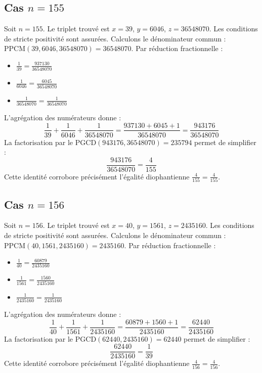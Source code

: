 \documentclass[11pt,a4paper]{article}
\begin{document}
\subsection{Cas $n = 155$}
Soit $n = 155$. Le triplet trouvé est $x = 39$, $y = 6046$, $z = 36548070$.
Les conditions de stricte positivité sont assurées.
Calculons le dénominateur commun : $\text{PPCM}(39, 6046, 36548070) = 36548070$.
Par réduction fractionnelle :
\begin{itemize}
    \item $\frac{1}{39} = \frac{937130}{36548070}$
    \item $\frac{1}{6046} = \frac{6045}{36548070}$
    \item $\frac{1}{36548070} = \frac{1}{36548070}$
\end{itemize}
L'agrégation des numérateurs donne :
$$ \frac{1}{39} + \frac{1}{6046} + \frac{1}{36548070} = \frac{937130 + 6045 + 1}{36548070} = \frac{943176}{36548070} $$
La factorisation par le $\text{PGCD}(943176, 36548070) = 235794$ permet de simplifier :
$$ \frac{943176}{36548070} = \frac{4}{155} $$
Cette identité corrobore précisément l'égalité diophantienne $\frac{4}{155} = \frac{4}{155}$.

\subsection{Cas $n = 156$}
Soit $n = 156$. Le triplet trouvé est $x = 40$, $y = 1561$, $z = 2435160$.
Les conditions de stricte positivité sont assurées.
Calculons le dénominateur commun : $\text{PPCM}(40, 1561, 2435160) = 2435160$.
Par réduction fractionnelle :
\begin{itemize}
    \item $\frac{1}{40} = \frac{60879}{2435160}$
    \item $\frac{1}{1561} = \frac{1560}{2435160}$
    \item $\frac{1}{2435160} = \frac{1}{2435160}$
\end{itemize}
L'agrégation des numérateurs donne :
$$ \frac{1}{40} + \frac{1}{1561} + \frac{1}{2435160} = \frac{60879 + 1560 + 1}{2435160} = \frac{62440}{2435160} $$
La factorisation par le $\text{PGCD}(62440, 2435160) = 62440$ permet de simplifier :
$$ \frac{62440}{2435160} = \frac{1}{39} $$
Cette identité corrobore précisément l'égalité diophantienne $\frac{4}{156} = \frac{4}{156}$.
\end{document}
